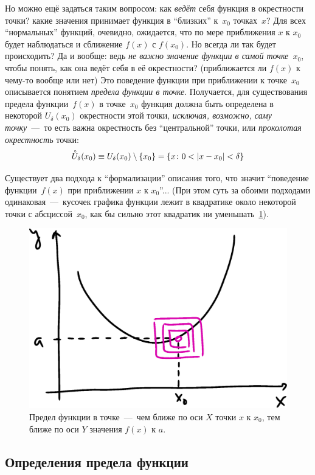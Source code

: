 \documentclass[a4paper,12pt]{article}
\renewcommand{\mathring}[1]{\accentset{\circ}{#1}}
\begin{document}
  Но можно ещё задаться таким вопросом: как \emph{ведёт} себя функция в окрестности точки?
  какие значения принимает функция в ``близких'' к~$x_0$ точках~$x$?
  Для всех ``нормальных'' функций, очевидно, ожидается, что по мере приближения $x$ к $x_0$ будет наблюдаться и сближение $f(x)$ с $f(x_0)$.
  Но всегда ли так будет происходить?
  Да и вообще: ведь \emph{не важно значение функции в самой точке~$x_0$}, чтобы понять, как она ведёт себя в её окрестности? (приближается ли $f(x)$ к чему-то вообще или нет)
  Это поведение функции при приближении к точке~$x_0$ описывается понятием \emph{предела функции в точке}.
  Получается, для существования предела функции~$f(x)$ в точке~$x_0$ функция должна быть определена в некоторой $U_{\delta}(x_0)$ окрестности этой точки, \emph{исключая, возможно, саму точку}~---~то есть важна окрестность без ``центральной'' точки, или \emph{проколотая окрестность} точки:
  \[
    \mathring U_{\delta}(x_0) \hm\equiv U_{\delta}(x_0) \hm\setminus \{x_0\} = \{x\colon 0 \hm< |x \hm- x_0| \hm< \delta\}
  \]

  Существует два подхода к ``формализации'' описания того, что значит ``поведение функции~$f(x)$ при приближении $x$ к $x_0$''...
  (При этом суть за обоими подходами одинаковая~---~кусочек графика функции лежит в квадратике около некоторой точки с абсциссой~$x_0$, как бы сильно этот квадратик ни уменьшать~\ref{fig:squares}).
  
  \begin{figure}[ht]
    \centering
    \includegraphics[width=0.6\linewidth]{images/squares}
    
    \caption{
      Предел функции в точке~---~чем ближе по оси $X$ точки $x$ к $x_0$, тем ближе по оси $Y$ значения $f(x)$ к $a$.
    }
    \label{fig:squares}
  \end{figure}


  \subsection{Определения предела функции}
  
\end{document}
